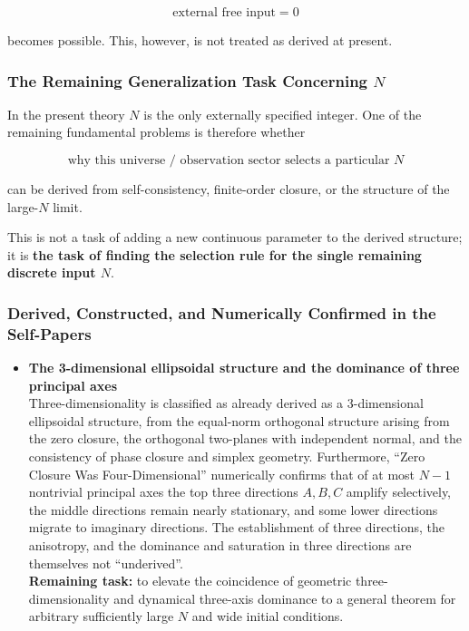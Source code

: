 \documentclass[
  a4paper,
]{article}
\providecommand{\tightlist}{%
  \setlength{\itemsep}{0pt}\setlength{\parskip}{0pt}}
\begin{document}
\[
\boxed{
\text{external free input}=0
}
\]

becomes possible. This, however, is not treated as derived at present.

\subsubsection{\texorpdfstring{The Remaining Generalization Task
Concerning
\(N\)}{The Remaining Generalization Task Concerning N}}\label{the-remaining-generalization-task-concerning-n}

In the present theory \(N\) is the only externally specified integer.
One of the remaining fundamental problems is therefore whether

\[
\boxed{
\text{why this universe / observation sector selects a particular }N
}
\]

can be derived from self-consistency, finite-order closure, or the
structure of the large-\(N\) limit.

This is not a task of adding a new continuous parameter to the derived
structure; it is \textbf{the task of finding the selection rule for the
single remaining discrete input \(N\)}.

\subsubsection{Derived, Constructed, and Numerically Confirmed in the
Self-Papers}\label{derived-constructed-and-numerically-confirmed-in-the-self-papers}

\begin{itemize}
\tightlist
\item
  \textbf{The 3-dimensional ellipsoidal structure and the dominance of
  three principal axes}\\
  Three-dimensionality is classified as already derived as a
  3-dimensional ellipsoidal structure, from the equal-norm orthogonal
  structure arising from the zero closure, the orthogonal two-planes
  with independent normal, and the consistency of phase closure and
  simplex geometry. Furthermore, ``Zero Closure Was Four-Dimensional''
  numerically confirms that of at most \(N-1\) nontrivial principal axes
  the top three directions \(A,B,C\) amplify selectively, the middle
  directions remain nearly stationary, and some lower directions migrate
  to imaginary directions. The establishment of three directions, the
  anisotropy, and the dominance and saturation in three directions are
  themselves not ``underived''.\\
  \textbf{Remaining task:} to elevate the coincidence of geometric
  three-dimensionality and dynamical three-axis dominance to a general
  theorem for arbitrary sufficiently large \(N\) and wide initial
  conditions.
\end{itemize}
\end{document}
